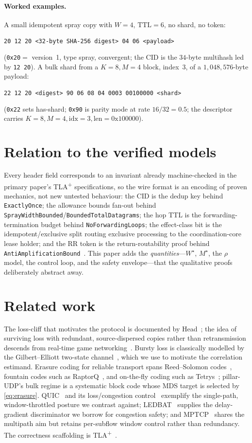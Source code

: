 \documentclass[10pt,twocolumn]{article}
\newcommand{\code}[1]{\texttt{\small #1}}
\newcommand{\Wstar}{W^{\star}}
\begin{document}
\paragraph{Worked examples.}
A small idempotent spray copy with $W{=}4$, $\text{TTL}{=}6$, no shard, no token:
\begin{center}\code{20 12 20 <32-byte SHA-256 digest> 04 06 <payload>}\end{center}
(\code{0x20}$=$ version~1, type spray, convergent; the CID is the $34$-byte
multihash led by \code{12 20}). A bulk shard from a $K{=}8, M{=}4$ block, index~3,
of a $1{,}048{,}576$-byte payload:
\begin{center}\code{22 12 20 <digest> 90 06 08 04 0003 00100000 <shard>}\end{center}
(\code{0x22} sets has-shard; \code{0x90} is parity mode at rate $16/32{=}0.5$;
the descriptor carries $K{=}8,M{=}4,\text{idx}{=}3,\text{len}{=}0\text{x}100000$).

\section{Relation to the verified models}
Every header field corresponds to an invariant already machine-checked in the
primary paper's TLA\textsuperscript{+} specifications, so the wire format is an
encoding of proven mechanics, not new untested behaviour: the CID is the dedup
key behind \code{ExactlyOnce}; the allowance bounds fan-out behind
\code{SprayWidthBounded}/\code{BoundedTotalDatagrams}; the hop TTL is the
forwarding-termination budget behind \code{NoForwardingLoops}; the effect-class
bit is the idempotent/exclusive split routing exclusive processing to the
coordination-core lease holder; and the RR token is the return-routability proof
behind \code{AntiAmplificationBound}~\cite{primary}. This paper adds the
\emph{quantities}---$\Wstar$, $M^\star$, the $\rho$ model, the control loop, and
the safety envelope---that the qualitative proofs deliberately abstract away.

\section{Related work}
The loss-cliff that motivates the protocol is documented by Head~\cite{grayson};
the idea of surviving loss with redundant, source-dispersed copies rather than
retransmission descends from real-time game networking~\cite{tribes}. Bursty loss
is classically modelled by the Gilbert--Elliott two-state
channel~\cite{gilbert,elliott}, which we use to motivate the correlation
estimand. Erasure coding for reliable transport spans Reed--Solomon
codes~\cite{reedsolomon}, fountain codes such as RaptorQ~\cite{raptorq}, and
on-the-fly coding such as Tetrys~\cite{tetrys}; pillar-UDP's bulk regime is a
systematic block code whose MDS target is selected by \eqref{eq:erasure}.
QUIC~\cite{quic} and its
loss/congestion control~\cite{quicrecovery} exemplify the single-path,
window-throttled posture we contrast against; LEDBAT~\cite{ledbat} supplies the
delay-gradient discriminator we borrow for congestion safety; and
MPTCP~\cite{mptcp} shares the multipath aim but retains per-subflow window
control rather than redundancy. The correctness scaffolding is
TLA\textsuperscript{+}~\cite{tlaplus}.
\end{document}

